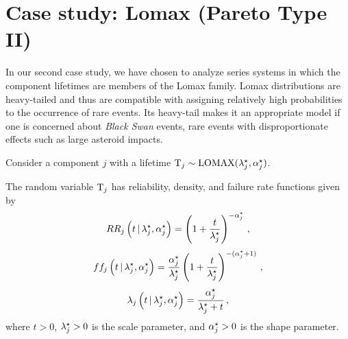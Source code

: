 \documentclass[../main.tex]{subfiles}
\begin{document}
\chapter{Case study: Lomax (Pareto Type II)}
In our second case study, we have chosen to analyze series systems in which the component lifetimes are members of the Lomax family. Lomax distributions are heavy-tailed and thus are compatible with assigning relatively high probabilities to the occurrence of rare events. Its heavy-tail makes it an appropriate model if one is concerned about \emph{Black Swan} events, rare events with disproportionate effects such as large asteroid impacts.

Consider a component $j$ with a lifetime $\mathrm{T}_j \sim \text{LOMAX}({\lambda}^{\star}_j, {\alpha}^{\star}_j)$.
\begin{definition}
\label{def:pareto_lifetime_functions}
The random variable $\mathrm{T}_j$ has reliability, density, and failure rate functions given by
\begin{equation}
R{R_j} \left (t {\,|\,} {\lambda}^{\star}_j, {\alpha}^{\star}_j \right ) =
    \left (1 + \frac{t}{{\lambda}^{\star}_j} \right )^{-{\alpha}^{\star}_j}\,,
\end{equation}
\begin{equation}
f{f_j} \left ( t {\,|\,} {\lambda}^{\star}_j, {\alpha}^{\star}_j \right ) =
    \frac{{\alpha}^{\star}_j}{{\lambda}^{\star}_j} \left (1 + \frac{t}{{\lambda}^{\star}_j} \right )^{-({\alpha}^{\star}_j + 1)}\,,
\end{equation}
\begin{equation}
\lambda_j \left ( t {\,|\,} {\lambda}^{\star}_j, {\alpha}^{\star}_j \right ) =
    \frac{{\alpha}^{\star}_j}{{\lambda}^{\star}_j + t}\,,
\end{equation}
where $t > 0$, ${\lambda}^{\star}_j > 0$ is the scale parameter, and ${\alpha}^{\star}_j > 0$ is the shape parameter.
\end{definition}
\end{document}

